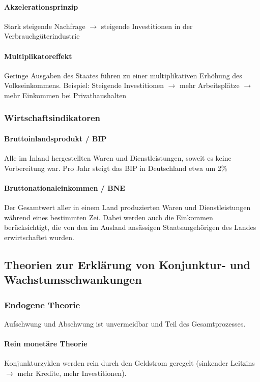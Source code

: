 \documentclass{article}
\begin{document}
	\paragraph{Akzelerationsprinzip}
	Stark steigende Nachfrage $\rightarrow$ steigende Investitionen in der Verbrauchgüterindustrie

	\paragraph{Multiplikatoreffekt}
	Geringe Ausgaben des Staates führen zu einer multiplikativen Erhöhung des Volkseinkommens. Beispiel: Steigende Investitionen $\rightarrow$ mehr Arbeitsplätze $\rightarrow$ mehr Einkommen bei Privathaushalten

	\subsubsection{Wirtschaftsindikatoren}

	\paragraph{Bruttoinlandsprodukt / BIP}
	Alle im Inland hergestellten Waren und Dienstleistungen, soweit es keine Vorbereitung war. Pro Jahr steigt das BIP in Deutschland etwa um 2\%

	\paragraph{Bruttonationaleinkommen / BNE}
	Der Gesamtwert aller in einem Land produzierten Waren und Dienstleistungen während eines bestimmten Zei. Dabei werden auch die Einkommen berücksichtigt, die von den im Ausland ansässigen Staatsangehörigen des Landes erwirtschaftet wurden.

	\subsection{Theorien zur Erklärung von Konjunktur- und Wachstumsschwankungen}
	\subsubsection{Endogene Theorie}
	Aufschwung und Abschwung ist unvermeidbar und Teil des Gesamtprozesses.

	\paragraph{Rein monetäre Theorie}
	Konjunkturzyklen werden rein durch den Geldstrom geregelt (sinkender Leitzins $\rightarrow$ mehr Kredite, mehr Investitionen).
\end{document}
